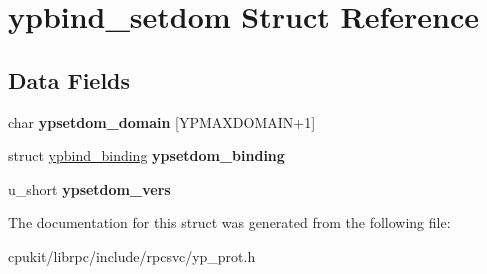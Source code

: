 \hypertarget{structypbind__setdom}{}\section{ypbind\+\_\+setdom Struct Reference}
\label{structypbind__setdom}
\subsection*{Data Fields}
\begin{DoxyCompactItemize}
\item 
\mbox{\label{structypbind__setdom_a315302fff03c17dfa747215a8645f7fc}} 
char {\bfseries ypsetdom\+\_\+domain} \mbox{[}Y\+P\+M\+A\+X\+D\+O\+M\+A\+IN+1\mbox{]}
\item 
\mbox{\label{structypbind__setdom_aa02bb4e0a9194b04778bf1b59f08bb51}} 
struct \mbox{\hyperlink{structypbind__binding}{ypbind\+\_\+binding}} {\bfseries ypsetdom\+\_\+binding}
\item 
\mbox{\label{structypbind__setdom_ac3ca3f37a5d571703d5e0397ef1533f3}} 
u\+\_\+short {\bfseries ypsetdom\+\_\+vers}
\end{DoxyCompactItemize}


The documentation for this struct was generated from the following file\+:\begin{DoxyCompactItemize}
\item 
cpukit/librpc/include/rpcsvc/yp\+\_\+prot.\+h\end{DoxyCompactItemize}

